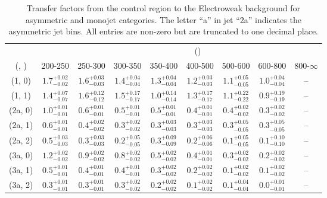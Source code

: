 \begin{table}[h!]
\tiny
\centering
\caption{Transfer factors from the \mj control region to the Electroweak background for asymmetric and monojet categories. The letter ``a'' in jet \eg ``2a''  indicates the asymmetric jet bins. All entries are non-zero but are truncated to one decimal place.\label{tab:tf_total_mu_asym}}
\begin{tabular}
{ccccccccc}
	\hline\hline
&	& \multicolumn{8}{c}{\scalht (\gev)} \\ 
	 (\njet,  \nb) & 200-250 & 250-300 & 300-350 & 350-400 & 400-500 & 500-600 & 600-800 & 800-$\infty$ \\ [0.8ex] 
\hline
	(1, 0) & $1.7^{+ 0.02 }_{- 0.02 }$ & $1.6^{+ 0.03 }_{- 0.03 }$ & $1.4^{+ 0.04 }_{- 0.04 }$ & $1.3^{+ 0.04 }_{- 0.04 }$ & $1.2^{+ 0.03 }_{- 0.03 }$ & $1.1^{+ 0.05 }_{- 0.05 }$ & $1.0^{+ 0.04 }_{- 0.04 }$ & -- \\[0.5ex] 
	(1, 1) & $1.4^{+ 0.07 }_{- 0.07 }$ & $1.6^{+ 0.12 }_{- 0.12 }$ & $1.5^{+ 0.17 }_{- 0.17 }$ & $1.0^{+ 0.14 }_{- 0.14 }$ & $1.3^{+ 0.17 }_{- 0.17 }$ & $1.1^{+ 0.22 }_{- 0.22 }$ & $0.9^{+ 0.19 }_{- 0.19 }$ & -- \\[0.5ex] 
	(2a, 0) & $1.0^{+ 0.01 }_{- 0.01 }$ & $0.6^{+ 0.01 }_{- 0.01 }$ & $0.5^{+ 0.01 }_{- 0.01 }$ & $0.5^{+ 0.01 }_{- 0.01 }$ & $0.4^{+ 0.01 }_{- 0.01 }$ & $0.4^{+ 0.02 }_{- 0.02 }$ & $0.3^{+ 0.02 }_{- 0.02 }$ & -- \\[0.5ex] 
	(2a, 1) & $0.6^{+ 0.01 }_{- 0.01 }$ & $0.4^{+ 0.02 }_{- 0.02 }$ & $0.3^{+ 0.02 }_{- 0.02 }$ & $0.3^{+ 0.03 }_{- 0.03 }$ & $0.3^{+ 0.03 }_{- 0.03 }$ & $0.3^{+ 0.05 }_{- 0.05 }$ & $0.3^{+ 0.05 }_{- 0.05 }$ & -- \\[0.5ex] 
	(2a, 2) & $0.5^{+ 0.03 }_{- 0.03 }$ & $0.3^{+ 0.03 }_{- 0.03 }$ & $0.2^{+ 0.05 }_{- 0.05 }$ & $0.3^{+ 0.09 }_{- 0.09 }$ & $0.2^{+ 0.06 }_{- 0.06 }$ & $0.1^{+ 0.05 }_{- 0.05 }$ & $0.1^{+ 0.10 }_{- 0.10 }$ & -- \\[0.5ex] 
	(3a, 0) & $1.2^{+ 0.02 }_{- 0.02 }$ & $0.9^{+ 0.02 }_{- 0.02 }$ & $0.8^{+ 0.02 }_{- 0.02 }$ & $0.5^{+ 0.02 }_{- 0.02 }$ & $0.4^{+ 0.01 }_{- 0.01 }$ & $0.3^{+ 0.02 }_{- 0.02 }$ & $0.2^{+ 0.02 }_{- 0.02 }$ & -- \\[0.5ex] 
	(3a, 1) & $0.5^{+ 0.01 }_{- 0.01 }$ & $0.4^{+ 0.01 }_{- 0.01 }$ & $0.4^{+ 0.01 }_{- 0.01 }$ & $0.3^{+ 0.02 }_{- 0.02 }$ & $0.2^{+ 0.02 }_{- 0.02 }$ & $0.1^{+ 0.02 }_{- 0.02 }$ & $0.1^{+ 0.02 }_{- 0.02 }$ & -- \\[0.5ex] 
	(3a, 2) & $0.3^{+ 0.01 }_{- 0.01 }$ & $0.3^{+ 0.01 }_{- 0.01 }$ & $0.3^{+ 0.02 }_{- 0.02 }$ & $0.2^{+ 0.02 }_{- 0.02 }$ & $0.1^{+ 0.02 }_{- 0.02 }$ & $0.1^{+ 0.04 }_{- 0.04 }$ & $0.0^{+ 0.01 }_{- 0.01 }$ & -- \\[0.5ex] 

\end{tabular}
\end{table}

